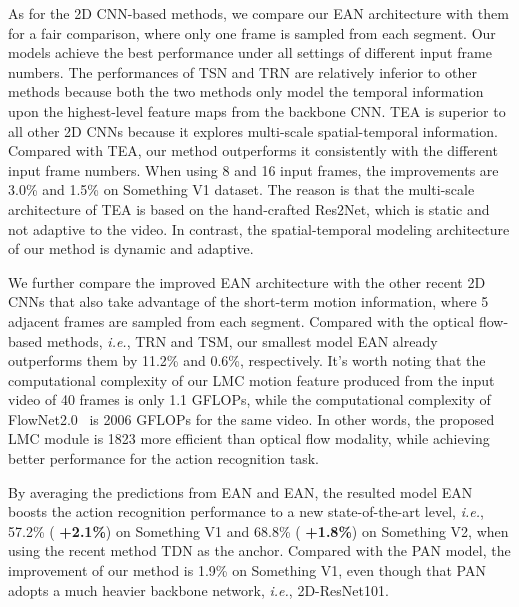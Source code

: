 As for the 2D CNN-based methods, we compare our EAN architecture with them for a fair comparison, where only one frame is sampled from each segment.
Our models achieve the best performance under all settings of different input frame numbers.
The performances of TSN and TRN are relatively inferior to other methods because both the two methods only model the temporal information upon the highest-level feature maps from the backbone CNN. TEA is superior to all other 2D CNNs because it explores multi-scale spatial-temporal information. Compared with TEA, our method outperforms it consistently with the different input frame numbers. When using 8 and 16 input frames, the improvements are 3.0\% and 1.5\% on Something V1 dataset. The reason is that the multi-scale architecture of TEA is based on the hand-crafted Res2Net, which is static and not adaptive to the video. In contrast, the spatial-temporal modeling architecture of our method is dynamic and adaptive.





We further compare the improved EAN architecture with the other recent 2D CNNs that also take advantage of the short-term motion information, where 5 adjacent frames are sampled from each segment. Compared with the optical flow-based methods, \textit{i.e.}, TRN and TSM, 
our smallest model EAN already outperforms them by 11.2\% and 0.6\%, respectively. It's worth noting that the computational complexity of our LMC motion feature produced from the input video of 40 frames is only 1.1 GFLOPs, while the computational complexity of FlowNet2.0~\cite{ilg2017flownet} is 2006 GFLOPs for the same video.
In other words, the proposed LMC module is 1823 more efficient than optical flow modality, while achieving better performance for the action recognition task.

By averaging the predictions from EAN and EAN, the resulted model EAN boosts the action recognition performance to a new state-of-the-art level, \textit{i.e.}, 57.2\% (\textbf{ +2.1\%}) on Something V1 and 68.8\% (\textbf{ +1.8\%}) on Something V2, when using the recent method TDN as the anchor.
Compared with the PAN model, the improvement of our method is 1.9\% on Something V1, even though that PAN adopts a much heavier backbone network, \textit{i.e.}, 2D-ResNet101.



